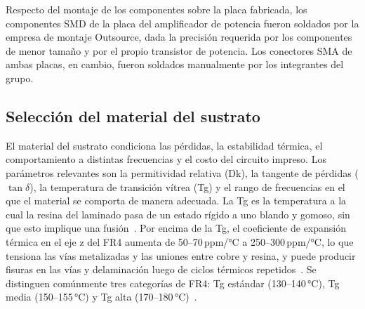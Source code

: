 Respecto del montaje de los componentes sobre la placa fabricada, los componentes SMD de la placa del amplificador de potencia fueron soldados por la empresa de montaje Outsource, dada la precisión requerida por los componentes de menor tamaño y por el propio transistor de potencia. Los conectores SMA de ambas placas, en cambio, fueron soldados manualmente por los integrantes del grupo.

\subsection{Selección del material del sustrato} \label{sec:material_sustrato}
El material del sustrato condiciona las pérdidas, la estabilidad térmica, el comportamiento a distintas frecuencias y el costo del circuito impreso. Los parámetros relevantes son la permitividad relativa (Dk), la tangente de pérdidas ($\tan\delta$), la temperatura de transición vítrea (Tg) y el rango de frecuencias en el que el material se comporta de manera adecuada. La Tg es la temperatura a la cual la resina del laminado pasa de un estado rígido a uno blando y gomoso, sin que esto implique una fusión~\cite{JLCTg}. Por encima de la Tg, el coeficiente de expansión térmica en el eje z del FR4 aumenta de 50--70\,ppm/°C a 250--300\,ppm/°C, lo que tensiona las vías metalizadas y las uniones entre cobre y resina, y puede producir fisuras en las vías y delaminación luego de ciclos térmicos repetidos~\cite{JLCTg}. Se distinguen comúnmente tres categorías de FR4: Tg estándar (130--140\,°C), Tg media (150--155\,°C) y Tg alta (170--180\,°C)~\cite{JLCTg}.

